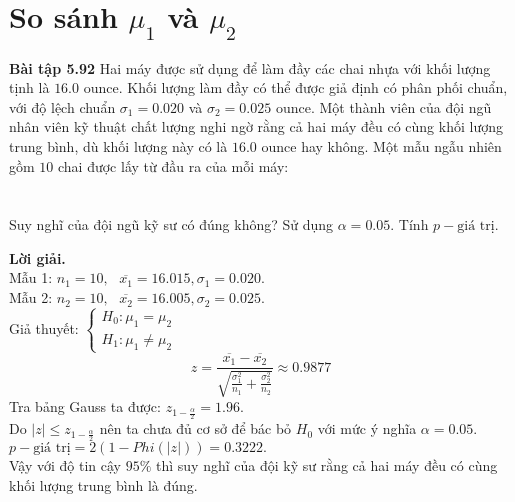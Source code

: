 \section{So sánh $\mu_1$ và $\mu_2$}
\begin{mybox}
\textbf{Bài tập 5.92} Hai máy được sử dụng để làm đầy các chai nhựa với khối lượng tịnh là $16.0$ ounce. Khối lượng làm đầy có thể được giả định có phân phối chuẩn, với độ lệch chuẩn $\sigma_1 = 0.020$ và $\sigma_2 = 0.025$ ounce. Một thành viên của đội ngũ nhân viên kỹ thuật chất lượng nghi ngờ rằng cả hai máy đều có cùng khối lượng trung bình, dù khối lượng này có là $16.0$ ounce hay không. Một mẫu ngẫu nhiên gồm $10$ chai được lấy từ đầu ra của mỗi máy:\\
\\
\\
Suy nghĩ của đội ngũ kỹ sư có đúng không? Sử dụng $\alpha = 0.05.$ Tính $p-\text{giá trị}.$
\end{mybox}
\textbf{Lời giải.}\\
Mẫu 1: $n_1 = 10, \text{ } \overline{x_1} = 16.015, \sigma_1 = 0.020.$\\
Mẫu 2: $n_2 = 10, \text{ } \overline{x_2} = 16.005, \sigma_2 = 0.025.$\\
Giả thuyết: $\begin{cases}
H_0: \mu_1 = \mu_2\\
H_1: \mu_1 \ne \mu_2
\end{cases}$\\
$$z = \frac{{\overline {{x_1}}  - \overline {{x_2}} }}{{\sqrt {\frac{{\sigma _1^2}}{{{n_1}}} + \frac{{\sigma _2^2}}{{{n_2}}}} }} \approx 0.9877$$
Tra bảng Gauss ta được: $z_{1 - \frac{\alpha}{2}} = 1.96.$\\
Do $\left| z \right| \leqslant z_{1 - \frac{\alpha}{2}}$ nên ta chưa đủ cơ sở để bác bỏ $H_0$ với mức ý nghĩa $\alpha = 0.05.$\\
$p-\text{giá trị} = 2 \left( {1 - Phi \left( {\left| z \right|} \right)} \right) = 0.3222.$\\
Vậy với độ tin cậy $95\%$ thì suy nghĩ của đội kỹ sư rằng cả hai máy đều có cùng khối lượng trung bình là đúng.

